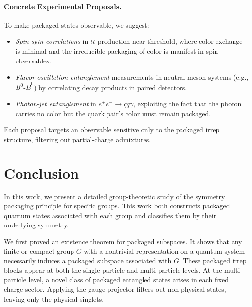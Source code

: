 \documentclass[12pt,a4paper]{article}
\begin{document}
\paragraph{Concrete Experimental Proposals.}
To make packaged states observable, we suggest:
\begin{itemize}
	\item \emph{Spin-spin correlations} in $t\bar t$ production near threshold, where color exchange is minimal and the irreducible packaging of color is manifest in spin observables.
	
	\item \emph{Flavor-oscillation entanglement} measurements in neutral meson systems (e.g., $B^0$-$\bar B^0$) by correlating decay products in paired detectors.
	
	\item \emph{Photon-jet entanglement} in $e^+e^-\to q\bar q\gamma$, exploiting the fact that the photon carries no color but the quark pair’s color must remain packaged.
\end{itemize}
Each proposal targets an observable sensitive only to the packaged irrep structure, filtering out partial-charge admixtures.





\section{Conclusion}


In this work, we present a detailed group-theoretic study of the symmetry packaging principle for specific groups.
This work both constructs packaged quantum states associated with each group and classifies them by their underlying symmetry.


We first proved an existence theorem for packaged subspaces.
It shows that any finite or compact group $G$ with a nontrivial representation on a quantum system necessarily induces a packaged subspace associated with $G$.
These packaged irrep blocks appear at both the single-particle and multi-particle levels.  
At the multi-particle level, a novel class of packaged entangled states arises in each fixed charge sector.  
Applying the gauge projector filters out non-physical states, leaving only the physical singlets.  
\end{document}
